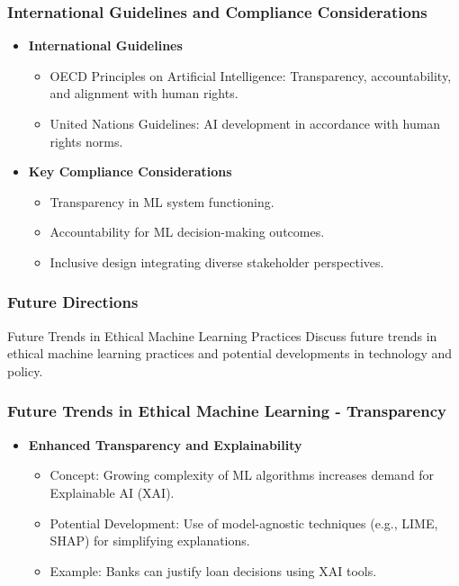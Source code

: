 \documentclass[aspectratio=169]{beamer}
\begin{document}
\begin{frame}[fragile]
    \frametitle{International Guidelines and Compliance Considerations}
    \begin{itemize}
        \item \textbf{International Guidelines}
        \begin{itemize}
            \item OECD Principles on Artificial Intelligence: Transparency, accountability, and alignment with human rights.
            \item United Nations Guidelines: AI development in accordance with human rights norms.
        \end{itemize}
        \item \textbf{Key Compliance Considerations}
        \begin{itemize}
            \item Transparency in ML system functioning.
            \item Accountability for ML decision-making outcomes.
            \item Inclusive design integrating diverse stakeholder perspectives.
        \end{itemize}
    \end{itemize}
\end{frame}

\begin{frame}
    \frametitle{Future Directions}
    \begin{block}{Future Trends in Ethical Machine Learning Practices}
        Discuss future trends in ethical machine learning practices and potential developments in technology and policy.
    \end{block}
\end{frame}

\begin{frame}[fragile]
    \frametitle{Future Trends in Ethical Machine Learning - Transparency}
    \begin{itemize}
        \item \textbf{Enhanced Transparency and Explainability}
        \begin{itemize}
            \item Concept: Growing complexity of ML algorithms increases demand for Explainable AI (XAI).
            \item Potential Development: Use of model-agnostic techniques (e.g., LIME, SHAP) for simplifying explanations.
            \item Example: Banks can justify loan decisions using XAI tools.
        \end{itemize}
    \end{itemize}
\end{frame}
\end{document}
